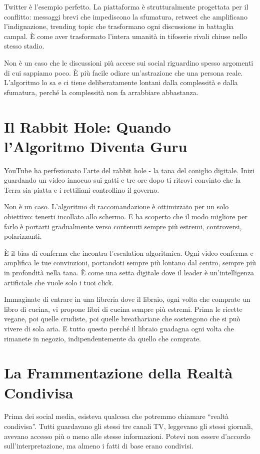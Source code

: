 Twitter è l'esempio perfetto. La piattaforma è strutturalmente progettata per il conflitto: messaggi brevi che impediscono la sfumatura, retweet che amplificano l'indignazione, trending topic che trasformano ogni discussione in battaglia campal. È come aver trasformato l'intera umanità in tifoserie rivali chiuse nello stesso stadio.

Non è un caso che le discussioni più accese sui social riguardino spesso argomenti di cui sappiamo poco. È più facile odiare un'astrazione che una persona reale. L'algoritmo lo sa e ci tiene deliberatamente lontani dalla complessità e dalla sfumatura, perché la complessità non fa arrabbiare abbastanza.

\section{Il Rabbit Hole: Quando l'Algoritmo Diventa Guru}

YouTube ha perfezionato l'arte del rabbit hole - la tana del coniglio digitale. Inizi guardando un video innocuo sui gatti e tre ore dopo ti ritrovi convinto che la Terra sia piatta e i rettiliani controllino il governo.

Non è un caso. L'algoritmo di raccomandazione è ottimizzato per un solo obiettivo: tenerti incollato allo schermo. E ha scoperto che il modo migliore per farlo è portarti gradualmente verso contenuti sempre più estremi, controversi, polarizzanti.

È il bias di conferma che incontra l'escalation algoritmica. Ogni video conferma e amplifica le tue convinzioni, portandoti sempre più lontano dal centro, sempre più in profondità nella tana. È come una setta digitale dove il leader è un'intelligenza artificiale che vuole solo i tuoi click.

Immaginate di entrare in una libreria dove il libraio, ogni volta che comprate un libro di cucina, vi propone libri di cucina sempre più estremi. Prima le ricette vegane, poi quelle crudiste, poi quelle breathariane che sostengono che si può vivere di sola aria. E tutto questo perché il libraio guadagna ogni volta che rimanete in negozio, indipendentemente da quello che comprate.

\section{La Frammentazione della Realtà Condivisa}

Prima dei social media, esisteva qualcosa che potremmo chiamare ``realtà condivisa''. Tutti guardavano gli stessi tre canali TV, leggevano gli stessi giornali, avevano accesso più o meno alle stesse informazioni. Potevi non essere d'accordo sull'interpretazione, ma almeno i fatti di base erano condivisi.

